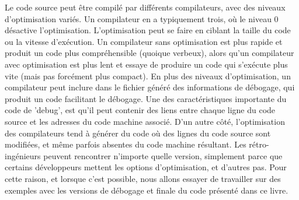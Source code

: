 Le code source peut être compilé par différents compilateurs, avec des niveaux d'optimisation variés.
Un compilateur en a typiquement trois, où le niveau 0 désactive l'optimisation.
L'optimisation peut se faire en ciblant la taille du code ou la vitesse d'exécution.
Un compilateur sans optimisation est plus rapide et produit un code plus compréhensible (quoique verbeux),
alors qu'un compilateur avec optimisation est plus lent et essaye de produire un code qui s'exécute plus
vite (mais pas forcément plus compact).
En plus des niveaux d'optimisation, un compilateur peut inclure dans le fichier généré des informations de
débogage, qui produit un code facilitant le débogage.
Une des caractéristiques importante du code de 'debug', est qu'il peut contenir des liens entre chaque ligne du code source et
les adresses du code machine associé.
D'un autre côté, l'optimisation des compilateurs tend à générer du code où des lignes du code source sont modifiées, et
même parfois absentes du code machine résultant.
Les rétro-ingénieurs peuvent rencontrer n'importe quelle version, simplement parce que certains développeurs mettent les options
d'optimisation, et d'autres pas.
Pour cette raison, et lorsque c'est possible, nous allons essayer de travailler sur des exemples avec les versions de débogage
et finale du code présenté dans ce livre.
